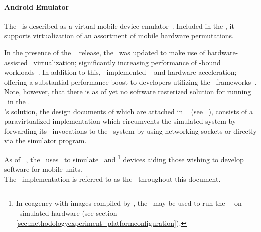 \paragraph{Android Emulator}
\label{par:relatedwork_qemu_androidemulator}
The \dvttermandroidemulator\ is described as a virtual mobile device emulator~.
Included in the \dvttermandroidsdk , it supports virtualization of an assortment of mobile hardware permutations.

In the presence of the \dvttermandroid\  release, the \dvttermandroidsdk\ was updated to make use of hardware-assisted \dvttermxeightysix\ virtualization; significantly increasing performance of \dvttermcpu -bound workloads~.
In addition to this, \dvttermgoogle\ implemented \dvttermopengles\  and  hardware acceleration; offering a substantial performance boost to developers utilizing the \dvttermopengles\ frameworks~.
Note, however, that there is as of yet no software rasterized solution for running \dvttermopenglestwopointo\ in the \dvttermandroidemulator .\\

\noindent
\dvttermgoogle 's solution, the design documents of which are attached in ~ (see ~), consists of a paravirtualized implementation which circumvents the simulated system by forwarding its \dvttermopengles\ invocations to the \dvttermhost\ system by using networking sockets or directly via the simulator program.

As of \dvttermandroid\ , the \dvttermandroidemulator\ uses \dvttermqemu\ to simulate \dvttermarm\ and \dvttermxeightysix \footnote{In coagency with images compiled by \dvttermintel , the \dvttermandroidemulator\ may be used to run the \dvttermandroid\ \dvttermos\ on \dvttermxeightysix\ simulated hardware (see section \ref{sec:methodologyexperiment_platformconfiguration}).} devices aiding those wishing to develop software for mobile units.\\

\noindent
The \dvttermandroidemulator\ implementation is referred to as the \dvttermreferencesolution\ throughout this document.
